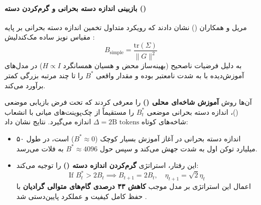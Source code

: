 \paragraph*{بازبینی اندازه دسته بحرانی و گرم‌کردن دسته ()}
مریل و همکاران () \cite{merrill2025cbs} نشان دادند که رویکرد متداول تخمین اندازه دسته بحرانی بر پایه مقیاس نویز ساده مک‌کندلیش \cite{mccandlish2018empirical}:
\begin{equation}
    B_{\text{simple}} = \frac{\text{tr}(\Sigma)}{\|G\|^2}
\end{equation}
به دلیل فرضیات ناصحیح (بهینه‌ساز  محض و هسیان همسانگرد $H \propto I$) در مدل‌های آموزش‌دیده با  به شدت نامعتبر بوده و مقدار واقعی $B^*$ را تا چند مرتبه بزرگی کمتر برآورد می‌کند. 

آن‌ها روش \textbf{آموزش شاخه‌ای محلی ()} را معرفی کردند که تحت فرض بازیابی موضعی ()، اندازه دسته بحرانی موضعی $B^*_t$ را مستقیماً از چک‌پوینت‌های میانی با انشعاب شاخه‌های کوتاه $\Delta = 2\text{B tokens}$ اندازه می‌گیرد. نتایج نشان داد:
\begin{itemize}
    \item اندازه دسته بحرانی در آغاز آموزش بسیار کوچک ($B^* \approx 0$) است، در طول ۵۰ میلیارد توکن اول به شدت جهش می‌کند و سپس حول $B^* \approx 4096$ به فلات می‌رسد.
    \item این رفتار، استراتژی \textbf{گرم‌کردن اندازه دسته ()} را توجیه می‌کند:
    \begin{equation}
        \text{If } B^*_t > 2 B_t \implies B_{t+1} = 2 B_t, \quad \eta_{t+1} = \sqrt{2} \eta_t
    \end{equation}
    اعمال این استراتژی بر مدل  موجب \textbf{کاهش ۴۳ درصدی گام‌های متوالی گرادیان} با حفظ کامل کیفیت و عملکرد پایین‌دستی شد \cite{merrill2025cbs}.
\end{itemize}

